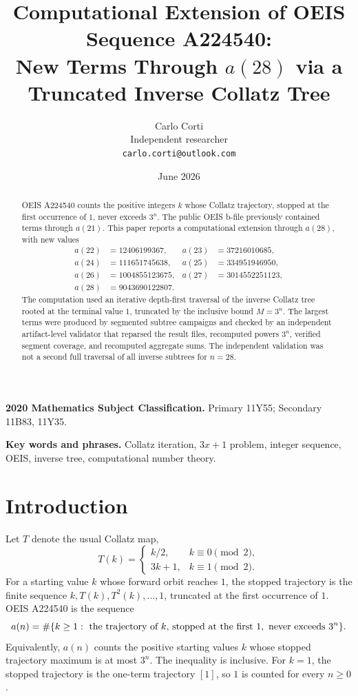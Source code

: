 \documentclass[11pt]{article}
\title{Computational Extension of OEIS Sequence A224540:\\
New Terms Through \(a(28)\) via a Truncated Inverse Collatz Tree}
\author{Carlo Corti\\
Independent researcher\\
\texttt{carlo.corti@outlook.com}}
\date{June 2026}
\theoremstyle{definition}
\theoremstyle{remark}
\begin{document}
\maketitle

\begin{abstract}
OEIS A224540 counts the positive integers \(k\) whose Collatz trajectory,
stopped at the first occurrence of \(1\), never exceeds \(3^n\).  The public
OEIS b-file previously contained terms through \(a(21)\).  This paper reports
a computational extension through \(a(28)\), with new values
\[
\begin{aligned}
a(22)&=12406199367, & a(23)&=37216010685,\\
a(24)&=111651745638, & a(25)&=334951946950,\\
a(26)&=1004855123675, & a(27)&=3014552251123,\\
a(28)&=9043690122807.
\end{aligned}
\]
The computation used an iterative depth-first traversal of the inverse
Collatz tree rooted at the terminal value \(1\), truncated by the inclusive
bound \(M=3^n\).  The largest terms were produced by segmented subtree
campaigns and checked by an independent artifact-level validator that
reparsed the result files, recomputed powers \(3^n\), verified segment
coverage, and recomputed aggregate sums.  The independent validation was not
a second full traversal of all inverse subtrees for \(n=28\).
\end{abstract}

\noindent\textbf{2020 Mathematics Subject Classification.}
Primary 11Y55; Secondary 11B83, 11Y35.

\noindent\textbf{Key words and phrases.}
Collatz iteration, \(3x+1\) problem, integer sequence, OEIS, inverse tree,
computational number theory.

\section{Introduction}

Let \(T\) denote the usual Collatz map,
\[
T(k)=
\begin{cases}
k/2, & k \equiv 0 \pmod 2,\\
3k+1, & k \equiv 1 \pmod 2.
\end{cases}
\]
For a starting value \(k\) whose forward orbit reaches \(1\), the stopped
trajectory is the finite sequence \(k,T(k),T^2(k),\ldots,1\), truncated at the
first occurrence of \(1\).
OEIS A224540 is the sequence
\[
a(n)=\#\{k\geq 1:\hbox{ the trajectory of }k\hbox{, stopped at the first }1,
\hbox{ never exceeds }3^n\}.
\]
Equivalently, \(a(n)\) counts the positive starting values \(k\) whose stopped
trajectory maximum is at most \(3^n\).  The inequality is inclusive.
For \(k=1\), the stopped trajectory is the one-term trajectory \([1]\), so
\(1\) is counted for every \(n\geq 0\).
\end{document}
